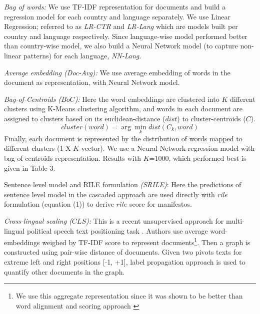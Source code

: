 \documentclass[11pt,a4paper]{article}
\newcommand{\argmin}{\arg\!\min}
\begin{document}
\begin{description}
\item{\textit{Bag of words:}} We use TF-IDF representation for documents and build a regression model for each country and language separately. We use Linear Regression; referred to as \textit{LR-CTR} and \textit{LR-Lang} which are models built per country and language respectively. Since language-wise model performed better than country-wise model, we also build a Neural Network model (to capture non-linear patterns) for each language, \textit{NN-Lang}.

\item{\textit{Average embedding (\textit{Doc-Avg}):}} We use average embedding of words in the document as representation, with Neural Network model.

\item{\textit{Bag-of-Centroids ($BoC$):}} Here the word embeddings are clustered into $K$ different clusters using K-Means clustering algorithm, and  words in each document are assigned to clusters based on its euclidean-distance ($dist$) to cluster-centroids ($C$). 
\[ cluster (word) = \argmin_k dist(C_{k}, word) \]
Finally, each document is represented by the distribution of words mapped to different clusters (1 X $K$ vector). We use a Neural Network regression model with bag-of-centroids representation. Results with $K$=1000, which performed best is given in Table 3.

\item{Sentence level model and RILE formulation \textit{(SRILE)}:} Here the predictions of sentence level model in the cascaded approach are used directly with \textit{rile} formulation (equation (1)) to derive $rile$ score for manifestos.

\item{\textit{Cross-lingual scaling ($CLS$):}} This is a recent unsupervised approach for multi-lingual political speech text positioning task \cite{EACL}. Authors use average word-embeddings weighed by TF-IDF score to represent documents\footnote{We use this aggregate representation since it was shown to be better than word alignment and scoring approach \cite{EACL}}. Then a graph is constructed using pair-wise distance of documents. Given two pivots texts for extreme left and right positions [-1, +1], label propagation approach is used to quantify other documents in the graph.
\end{description}
\end{document}
